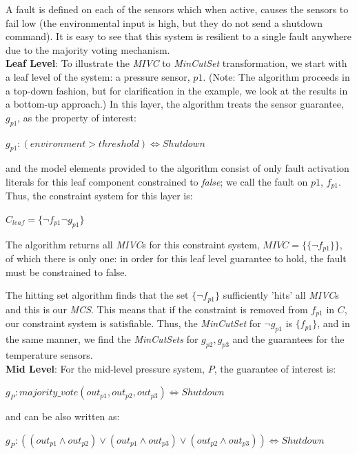 A fault is defined on each of the sensors which when active, causes the sensors to fail low (the environmental input is high, but they do not send a shutdown command). It is easy to see that this system is resilient to a single fault anywhere due to the majority voting mechanism. \\

\textbf{Leaf Level}: To illustrate the \textit{MIVC} to \textit{MinCutSet} transformation, we start with a leaf level of the system: a pressure sensor, $p1$. (Note: The \aivcalg algorithm proceeds in a top-down fashion, but for clarification in the example, we look at the results in a bottom-up approach.)  In this layer, the \aivcalg algorithm treats the sensor guarantee, $g_{p1}$, as the property of interest:
\begin{center}
    $g_{p1} : (environment > threshold) \iff Shutdown$
\end{center}
and the model elements provided to the \aivcalg algorithm consist of only fault activation literals for this leaf component constrained to \textit{false}; we call the fault on $p1$, $f_{p1}$. Thus, the constraint system for this layer is: 
\begin{center}
    $C_{leaf} = \{\neg f_{p1} \neg g_{p1}\}$
\end{center}

The \aivcalg algorithm returns all \textit{MIVC}s for this constraint system, $MIVC = \{\{\neg f_{p1}\}\}$, of which there is only one: in order for this leaf level guarantee to hold, the fault must be constrained to false. 

The hitting set algorithm finds that the set $\{\neg f_{p1}\}$ sufficiently 'hits' all \textit{MIVC}s and this is our \textit{MCS}. This means that if the constraint is removed from $f_{p1}$ in $C$, our constraint system is satisfiable. Thus, the \textit{MinCutSet} for $\neg g_{p1}$ is $\{f_{p1}\}$, and in the same manner, we find the \textit{MinCutSets} for $g_{p2}, g_{p3}$ and the guarantees for the temperature sensors. \\

\textbf{Mid Level}: For the mid-level pressure system, $P$, the guarantee of interest is: 
\begin{center}
    $g_P : majority\_vote(out_{p1}, out_{p2}, out_{p3}) \iff Shutdown$
\end{center}
and can be also written as: 
\begin{center}
    $g_P: ((out_{p1} \land out_{p2}) \lor (out_{p1} \land out_{p3}) \lor (out_{p2} \land out_{p3})) \iff Shutdown$
\end{center}

